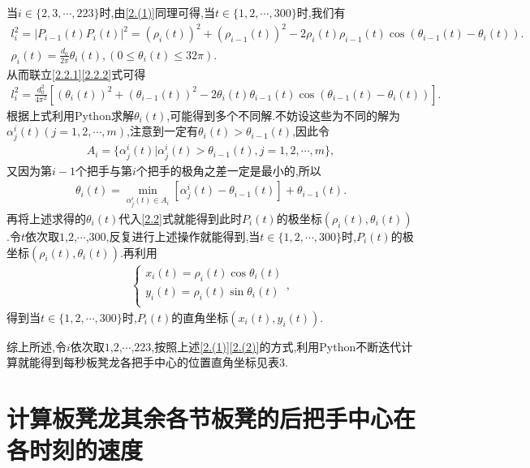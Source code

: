 \documentclass[lang=cn,newtx,10pt,scheme=chinese]{../Template/elegantbook}
\begin{document}
当\(i\in \{ 2,3,\cdots ,223 \}\)时,由\eqref{2.(1)}同理可得,当\(t\in \{ 1,2,\cdots ,300 \}\)时,我们有
\begin{gather}
l_{i}^{2}=| P_{i-1}(t)P_{i}(t)|^2=(\rho _{i}(t))^2+(\rho _{i-1}(t))^2 - 2\rho _{i}(t)\rho _{i-1}(t)\cos (\theta _{i-1}(t)-\theta _{i}(t)) .\label{2.2.1}
\\
\rho _{i}(t)=\frac{d_0}{2\pi}\theta _{i}(t),(0\leqslant \theta _{i}(t)\leqslant 32\pi) .\label{2.2.2}
\end{gather}
从而联立\eqref{2.2.1}\eqref{2.2.2}式可得
\begin{align}
l_{i}^{2}=\frac{d_{0}^{2}}{4\pi ^2}[(\theta _{i}(t))^2+(\theta _{i-1}(t))^2 - 2\theta _{i}(t)\theta _{i-1}(t)\cos (\theta _{i-1}(t)-\theta _{i}(t))] .\label{2.0.0}
\end{align}
根据上式利用Python求解\(\theta _{i}(t)\),可能得到多个不同解.不妨设这些为不同的解为\(\alpha _{j}^{i}(t) (j = 1,2,\cdots ,m)\),注意到一定有\(\theta _{i}(t)>\theta _{i-1}(t)\),因此令
\begin{align}
A_i = \{ \alpha _{j}^{i}(t) |\alpha _{j}^{i}(t) >\theta _{i-1}(t),j = 1,2,\cdots ,m \},
\end{align}
又因为第\(i - 1\)个把手与第$i$个把手的极角之差一定是最小的,所以
\begin{align}
\theta _i(t)=\underset{\alpha _{j}^{i}(t)\in A_i}{\min}\left[ \alpha _{j}^{i}\left( t \right) -\theta _{i-1}\left( t \right) \right] +\theta _{i-1}\left( t \right) .  
\end{align}
再将上述求得的\(\theta _i(t)\)代入\eqref{2.2}式就能得到此时\(P_{i}(t)\)的极坐标\((\rho _{i}(t),\theta _{i}(t))\).令\(t\)依次取\(1\),\(2\),\(\cdots\),\(300\),反复进行上述操作就能得到,当\(t\in \{ 1,2,\cdots ,300 \}\)时,\(P_{i}(t)\)的极坐标\((\rho _{i}(t),\theta _{i}(t))\).再利用
\begin{align}
\begin{cases}
x_{i}(t)=\rho _{i}(t)\cos \theta _{i}(t)\\
y_{i}(t)=\rho _{i}(t)\sin \theta _{i}(t)\\
\end{cases}, 
\end{align}
得到当\(t\in \{ 1,2,\cdots ,300 \}\)时,\(P_{i}(t)\)的直角坐标\((x_{i}(t),y_{i}(t))\).

综上所述,令\(i\)依次取\(1\),\(2\),\(\cdots\),\(223\),按照上述\eqref{2.(1)}\eqref{2.(2)}的方式,利用Python不断迭代计算就能得到每秒板凳龙各把手中心的位置直角坐标见表3.

\section{计算板凳龙其余各节板凳的后把手中心在各时刻的速度}
\end{document}

